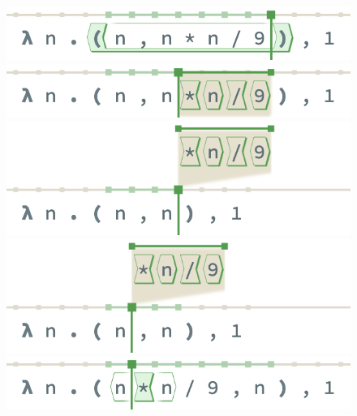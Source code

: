 \begin{figure}[h]
  \includegraphics[width=0.65\columnwidth]{img/restructuring-full-0.png}
  \includegraphics[width=0.65\columnwidth]{img/restructuring-full-1.png}
  \includegraphics[width=0.65\columnwidth]{img/restructuring-full-2.png}
  \includegraphics[width=0.65\columnwidth]{img/restructuring-full-3.png}
  \includegraphics[width=0.65\columnwidth]{img/restructuring-full-4.png}
\end{figure}


